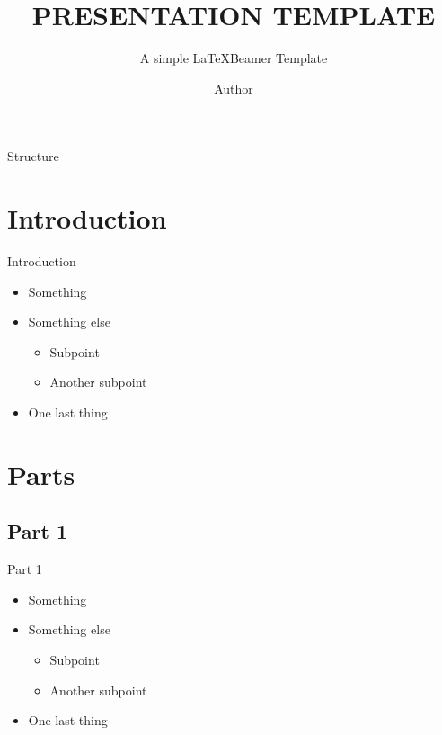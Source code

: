 \documentclass[aspectratio=169,t]{beamer}
\title{PRESENTATION TEMPLATE}
\subtitle{A simple \LaTeX Beamer Template}
\author{Author}
\institute{Institution}
\date{}
\begin{document}
\begin{frame}
	\titlepage
\end{frame}

\begin{frame}{Structure}
	\begin{Large}
		\tableofcontents[pausesections]
	\end{Large}
\end{frame}

\section{Introduction}
\begin{frame}{Introduction}
	\begin{itemize}[<+->]
		\item Something
		\item Something else
		      \begin{itemize}
			      \item Subpoint
			      \item Another subpoint
		      \end{itemize}
		\item One last thing
	\end{itemize}
\end{frame}

\section{Parts}
\subsection{Part 1}
\begin{frame}{Part 1}
	\begin{itemize}[<+->]
		\pause
		\item Something
		\item Something else
		      \begin{itemize}
			      \item Subpoint
			      \item Another subpoint
		      \end{itemize}
		\item One last thing
	\end{itemize}
\end{frame}
\end{document}

